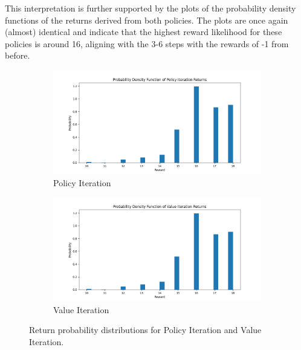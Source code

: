\documentclass{class}
\begin{document}
\noindent This interpretation is further supported by the plots of the probability density functions of the returns derived from both policies. The plots are once again (almost) identical and indicate that the highest reward likelihood for these policies is around 16, aligning with the 3-6 steps with the rewards of -1 from before.

\begin{figure}[H]
    \centering
    \begin{subfigure}[t]{0.48\linewidth}
        \centering
        \includegraphics[width=\linewidth]{../plots/return_probability/policy_iteration_return_probability.png}
        \caption{Policy Iteration}
        \label{fig:policy_iteration_return_probability}
    \end{subfigure}
    \hfill
    \begin{subfigure}[t]{0.48\linewidth}
        \centering
        \includegraphics[width=\linewidth]{../plots/return_probability/value_iteration_return_probability.png}
        \caption{Value Iteration}
        \label{fig:value_iterations_return_probability}
    \end{subfigure}
    \caption{Return probability distributions for Policy Iteration and Value Iteration.}
    \label{fig:DP_return_probability_comparison}
\end{figure}
\end{document}
